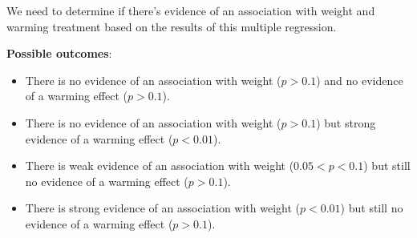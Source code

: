 \documentclass{article}
\begin{document}
We need to determine if there's evidence of an association with weight and warming treatment based on the results of this multiple regression.

\textbf{Possible outcomes}:
\begin{itemize}
    \item There is no evidence of an association with weight (\( p > 0.1 \)) and no evidence of a warming effect (\( p > 0.1 \)).
    \item There is no evidence of an association with weight (\( p > 0.1 \)) but strong evidence of a warming effect (\( p < 0.01 \)).
    \item There is weak evidence of an association with weight (\( 0.05 < p < 0.1 \)) but still no evidence of a warming effect (\( p > 0.1 \)).
    \item There is strong evidence of an association with weight (\( p < 0.01 \)) but still no evidence of a warming effect (\( p > 0.1 \)).
\end{itemize}
\end{document}
